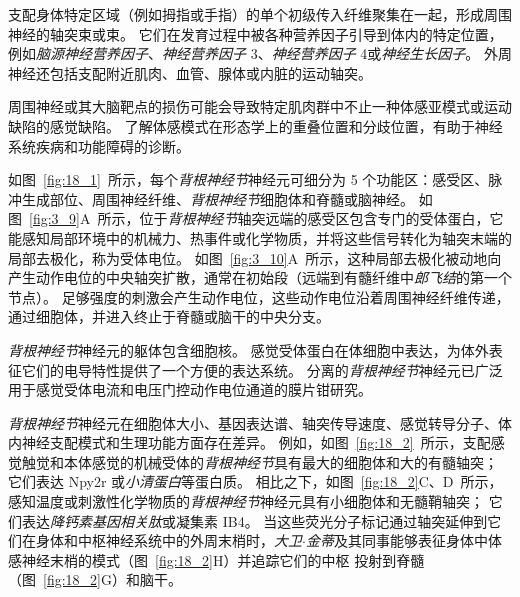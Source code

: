支配身体特定区域（例如拇指或手指）的单个初级传入纤维聚集在一起，形成周围神经的轴突束或束。
它们在发育过程中被各种营养因子引导到体内的特定位置，例如\textit{脑源神经营养因子}、\textit{神经营养因子} 3、\textit{神经营养因子} 4或\textit{神经生长因子}。
外周神经还包括支配附近肌肉、血管、腺体或内脏的运动轴突。


周围神经或其大脑靶点的损伤可能会导致特定肌肉群中不止一种体感亚模式或运动缺陷的感觉缺陷。
了解体感模式在形态学上的重叠位置和分歧位置，有助于神经系统疾病和功能障碍的诊断。


如图~\ref{fig:18_1}~所示，每个\textit{背根神经节}神经元可细分为 5 个功能区：感受区、脉冲生成部位、周围神经纤维、\textit{背根神经节}细胞体和脊髓或脑神经。
如图~\ref{fig:3_9}A~所示，位于\textit{背根神经节}轴突远端的感受区包含专门的受体蛋白，它能感知局部环境中的机械力、热事件或化学物质，并将这些信号转化为轴突末端的局部去极化，称为受体电位。
如图~\ref{fig:3_10}A~所示，这种局部去极化被动地向产生动作电位的中央轴突扩散，通常在初始段（远端到有髓纤维中\textit{郎飞结}的第一个节点）。
足够强度的刺激会产生动作电位，这些动作电位沿着周围神经纤维传递，通过细胞体，并进入终止于脊髓或脑干的中央分支。


\textit{背根神经节}神经元的躯体包含细胞核。 
感觉受体蛋白在体细胞中表达，为体外表征它们的电导特性提供了一个方便的表达系统。 
分离的\textit{背根神经节}神经元已广泛用于感觉受体电流和电压门控动作电位通道的膜片钳研究。


\textit{背根神经节}神经元在细胞体大小、基因表达谱、轴突传导速度、感觉转导分子、体内神经支配模式和生理功能方面存在差异。 
例如，如图~\ref{fig:18_2}~所示，支配感觉触觉和本体感觉的机械受体的\textit{背根神经节}具有最大的细胞体和大的有髓轴突；
它们表达 Npy2r 或\textit{小清蛋白}等蛋白质。
相比之下，如图~\ref{fig:18_2}C、D~所示，感知温度或刺激性化学物质的\textit{背根神经节}神经元具有小细胞体和无髓鞘轴突；
它们表达\textit{降钙素基因相关肽}或凝集素 IB4。 
当这些荧光分子标记通过轴突延伸到它们在身体和中枢神经系统中的外周末梢时，\textit{大卫$\cdot$金蒂}及其同事能够表征身体中体感神经末梢的模式（图~\ref{fig:18_2}H）并追踪它们的中枢 投射到脊髓（图~\ref{fig:18_2}G）和脑干。

